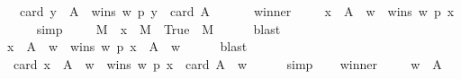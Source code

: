 \begin{isabellebody}
\ \ \ {\isachardoublequoteopen}card\ {\isacharbraceleft}{\kern0pt}y\ {\isasymin}\ A\ {\isachardot}{\kern0pt}\ wins\ w\ p\ y{\isacharbraceright}{\kern0pt}\ {\isacharequal}{\kern0pt}\ card\ A\ {\isacharminus}{\kern0pt}{}{\isachardoublequoteclose}\isanewline
%
\isadelimproof
%
\endisadelimproof
%
\isatagproof
{}\isamarkupfalse%
\ {\isacharminus}{\kern0pt}\isanewline
\ \ \isamarkupfalse%
\ winner\isanewline
\ \ \isamarkupfalse%
\ {}{\isacharcolon}{\kern0pt}\ {\isachardoublequoteopen}{\isasymforall}x\ {\isasymin}\ A\ {\isacharminus}{\kern0pt}\ {\isacharbraceleft}{\kern0pt}w{\isacharbraceright}{\kern0pt}\ {\isachardot}{\kern0pt}\ wins\ w\ p\ x{\isachardoublequoteclose}\isanewline
\ \ \ \ \isamarkupfalse%
\ simp\isanewline
\ \ \isamarkupfalse%
\ {}{\isacharcolon}{\kern0pt}\ {\isachardoublequoteopen}{\isasymforall}M\ {\isachardot}{\kern0pt}\ {\isacharbraceleft}{\kern0pt}x\ {\isasymin}\ M\ {\isachardot}{\kern0pt}\ True{\isacharbraceright}{\kern0pt}\ {\isacharequal}{\kern0pt}\ M{\isachardoublequoteclose}\isanewline
\ \ \ \ \isamarkupfalse%
\ blast\isanewline
\ \ \isamarkupfalse%
\ {}\ {}\isanewline
\ \ \isamarkupfalse%
\ {\isachardoublequoteopen}{\isacharbraceleft}{\kern0pt}x\ {\isasymin}\ A\ {\isacharminus}{\kern0pt}\ {\isacharbraceleft}{\kern0pt}w{\isacharbraceright}{\kern0pt}\ {\isachardot}{\kern0pt}\ wins\ w\ p\ x{\isacharbraceright}{\kern0pt}\ {\isacharequal}{\kern0pt}\ A\ {\isacharminus}{\kern0pt}\ {\isacharbraceleft}{\kern0pt}w{\isacharbraceright}{\kern0pt}{\isachardoublequoteclose}\isanewline
\ \ \ \ \isamarkupfalse%
\ blast\isanewline
\ \ \isamarkupfalse%
\ {}{}{\isacharcolon}{\kern0pt}\ {\isachardoublequoteopen}card\ {\isacharbraceleft}{\kern0pt}x\ {\isasymin}\ A\ {\isacharminus}{\kern0pt}\ {\isacharbraceleft}{\kern0pt}w{\isacharbraceright}{\kern0pt}\ {\isachardot}{\kern0pt}\ wins\ w\ p\ x{\isacharbraceright}{\kern0pt}\ {\isacharequal}{\kern0pt}\ card\ {\isacharparenleft}{\kern0pt}A\ {\isacharminus}{\kern0pt}\ {\isacharbraceleft}{\kern0pt}w{\isacharbraceright}{\kern0pt}{\isacharparenright}{\kern0pt}{\isachardoublequoteclose}\isanewline
\ \ \ \ \isamarkupfalse%
\ simp\isanewline
\ \ \isamarkupfalse%
\ winner\isanewline
\ \ \isamarkupfalse%
\ {}{}{\isacharcolon}{\kern0pt}\ {\isachardoublequoteopen}w\ {\isasymin}\ A{\isachardoublequoteclose}\isanewline

\end{isabellebody}
